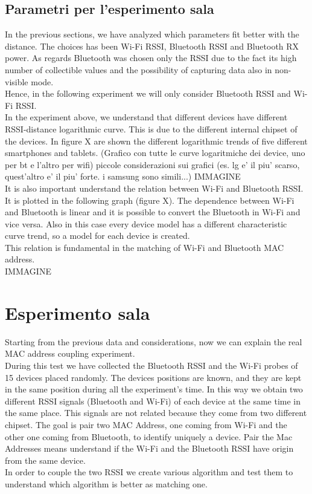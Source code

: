 \subsection{Parametri per l'esperimento sala}
In the previous sections, we have analyzed which parameters fit better with the distance. The choices has been Wi-Fi RSSI, Bluetooth RSSI and Bluetooth RX power. As regards Bluetooth was chosen only the RSSI due to the fact its high number of collectible values and the possibility of capturing data also in non-visible mode.\\
Hence, in the following experiment we will only consider Bluetooth RSSI and Wi-Fi RSSI.\\
In the experiment above, we understand that different devices have different RSSI-distance logarithmic curve. This is due to the different internal chipset of the devices. In figure X are shown the different logarithmic trends of five different smartphones and tablets. (Grafico con tutte le curve logaritmiche dei device, uno per bt e l'altro per wifi) piccole considerazioni sui grafici (es. lg e' il piu' scarso, quest'altro e' il piu' forte. i samsung sono simili...)
IMMAGINE\\
\linebreak
It is also important understand the relation between Wi-Fi and Bluetooth RSSI. It is plotted in the following graph (figure X). The dependence between Wi-Fi and Bluetooth is linear and it is possible to convert the Bluetooth in Wi-Fi and vice versa. Also in this case every device model has a different characteristic curve trend, so a model for each device is created.\\
This relation is fundamental in the matching of Wi-Fi and Bluetooth MAC address.\\
IMMAGINE
\section{Esperimento sala}
Starting from the previous data and considerations, now we can explain the real MAC address coupling experiment.\\
\linebreak
During this test we have collected the Bluetooth RSSI and the Wi-Fi probes of 15 devices placed randomly. The devices positions are known, and they are kept in the same position during all the experiment's time. In this way we obtain two different RSSI signals (Bluetooth and Wi-Fi) of each device at the same time in the same place. This signals are not related because they come from two different chipset. The goal is pair two MAC Address, one coming from Wi-Fi and the other one coming from Bluetooth, to identify uniquely a device. Pair the Mac Addresses means understand if the Wi-Fi and the Bluetooth RSSI have origin from the same device.\\
\linebreak
In order to couple the two RSSI we create various algorithm and test them to understand which algorithm is better as matching one.

